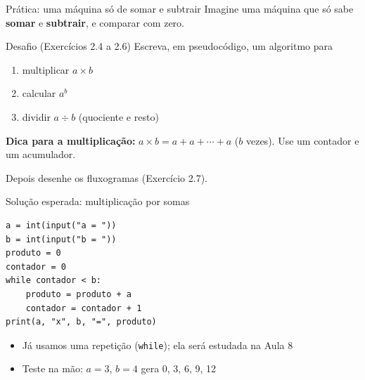 \documentclass[aspectratio=169,10pt,t]{beamer}
\begin{document}
\begin{frame}{Prática: uma máquina só de somar e subtrair}
  Imagine uma máquina que só sabe \textbf{somar} e \textbf{subtrair}, e comparar com zero.

  \begin{exampleblock}{Desafio (Exercícios 2.4 a 2.6)}
    Escreva, em pseudocódigo, um algoritmo para
    \begin{enumerate}
      \item multiplicar \(a \times b\)
      \item calcular \(a^b\)
      \item dividir \(a \div b\) (quociente e resto)
    \end{enumerate}
  \end{exampleblock}
  \textbf{Dica para a multiplicação:} \(a\times b = a + a + \cdots + a\) (\(b\) vezes). Use um contador e um acumulador.
  \vspace{1ex}

  \footnotesize Depois desenhe os fluxogramas (Exercício 2.7).
\end{frame}

\begin{frame}[fragile]{Solução esperada: multiplicação por somas}
\begin{lstlisting}
a = int(input("a = "))
b = int(input("b = "))
produto = 0
contador = 0
while contador < b:
    produto = produto + a
    contador = contador + 1
print(a, "x", b, "=", produto)
\end{lstlisting}
  \begin{itemize}
    \item Já usamos uma repetição (\texttt{while}); ela será estudada na Aula 8
    \item Teste na mão: \(a=3\), \(b=4\) gera 0, 3, 6, 9, 12
  \end{itemize}
\end{frame}


\end{document}
